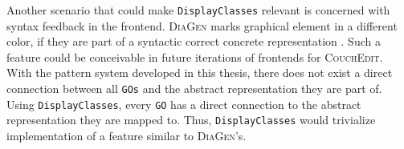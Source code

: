 

Another scenario that could make \texttt{DisplayClasses} relevant is concerned with syntax feedback in the frontend. \textsc{DiaGen} marks graphical element in a different color, if they are part of a syntactic correct concrete representation \cite{minas_concepts_2002}. Such a feature could be conceivable in future iterations of frontends for \textsc{CouchEdit}. With the pattern system developed in this thesis, there does not exist a direct connection between all \texttt{GOs} and the abstract representation they are part of. Using \texttt{DisplayClasses}, every \texttt{GO} has a direct connection to the abstract representation they are mapped to. Thus, \texttt{DisplayClasses} would trivialize implementation of a feature similar to \textsc{DiaGen}'s.



\section{}



